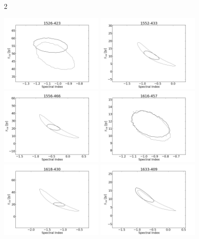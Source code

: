 \documentclass[preprint]{aastex}
\begin{document}
\clearpage
\begin{figure}[htbp]2\begin{center}
\includegraphics[width=2in]{plots/1526-423_SI_MCMC.png} %
\includegraphics[width=2in]{plots/1552-433_SI_MCMC.png} %
\includegraphics[width=2in]{plots/1556-466_SI_MCMC.png} %
\includegraphics[width=2in]{plots/1616-457_SI_MCMC.png} %
\includegraphics[width=2in]{plots/1618-430_SI_MCMC.png} %
\includegraphics[width=2in]{plots/1633-409_SI_MCMC.png} %

\end{center}
\end{figure}
\end{document}
